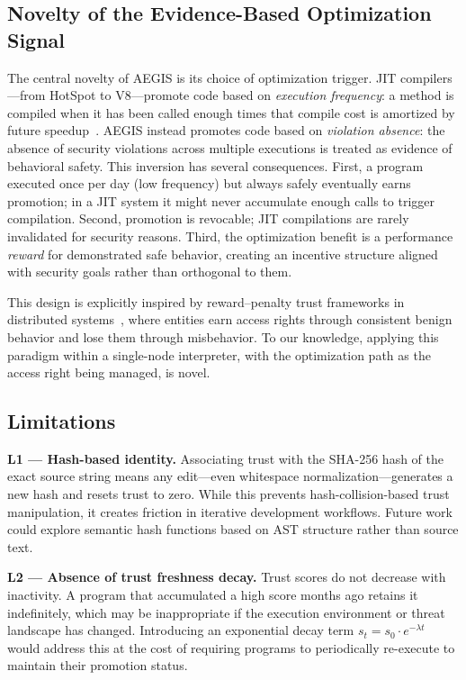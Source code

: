 \documentclass[conference]{IEEEtran}
\begin{document}
\subsection{Novelty of the Evidence-Based Optimization Signal}

The central novelty of AEGIS is its choice of optimization
trigger. JIT compilers—from HotSpot to V8—promote code based on
\emph{execution frequency}: a method is compiled when it has been
called enough times that compile cost is amortized by future
speedup~\cite{qin2022jit_security}. AEGIS instead promotes code
based on \emph{violation absence}: the absence of security
violations across multiple executions is treated as evidence of
behavioral safety. This inversion has several consequences. First,
a program executed once per day (low frequency) but always safely
eventually earns promotion; in a JIT system it might never
accumulate enough calls to trigger compilation. Second, promotion
is revocable; JIT compilations are rarely invalidated for security
reasons. Third, the optimization benefit is a performance
\emph{reward} for demonstrated safe behavior, creating an incentive
structure aligned with security goals rather than orthogonal to them.

This design is explicitly inspired by reward--penalty trust
frameworks in distributed
systems~\cite{wang2022trust,li2022iot_trust,fernandez2024sla}, where
entities earn access rights through consistent benign behavior and
lose them through misbehavior. To our knowledge, applying this
paradigm within a single-node interpreter, with the optimization
path as the access right being managed, is novel.

\subsection{Limitations}

\textbf{L1 — Hash-based identity.} Associating trust with the
SHA-256 hash of the exact source string means any edit—even
whitespace normalization—generates a new hash and resets trust to
zero. While this prevents hash-collision-based trust manipulation,
it creates friction in iterative development workflows. Future
work could explore semantic hash functions based on AST structure
rather than source text.

\textbf{L2 — Absence of trust freshness decay.} Trust scores do not
decrease with inactivity. A program that accumulated a high score
months ago retains it indefinitely, which may be inappropriate if
the execution environment or threat landscape has changed.
Introducing an exponential decay term $s_t = s_0 \cdot
e^{-\lambda t}$ would address this at the cost of requiring
programs to periodically re-execute to maintain their promotion
status.
\end{document}
